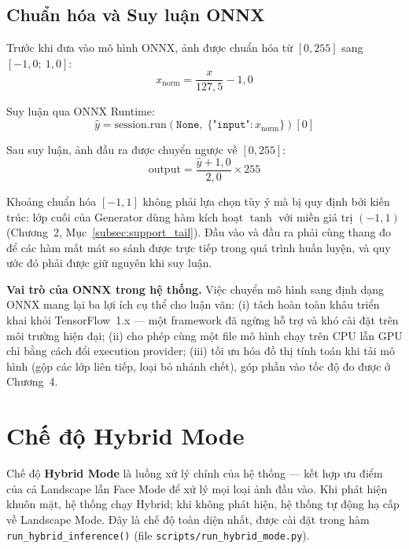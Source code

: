 \subsection{Chuẩn hóa và Suy luận ONNX}
\label{subsec:normalize_inference}

Trước khi đưa vào mô hình ONNX, ảnh được chuẩn hóa từ $[0, 255]$ sang $[-1{,}0;\ 1{,}0]$:
\begin{equation}
\label{eq:normalize}
x_{\text{norm}} = \frac{x}{127{,}5} - 1{,}0
\end{equation}

Suy luận qua ONNX Runtime:
\begin{equation}
\label{eq:onnx_inference}
\hat{y} = \text{session.run}\!\left(\texttt{None},\; \{\texttt{"input"}: x_{\text{norm}}\}\right)[0]
\end{equation}

Sau suy luận, ảnh đầu ra được chuyển ngược về $[0, 255]$:
\begin{equation}
\label{eq:denormalize}
\text{output} = \frac{\hat{y} + 1{,}0}{2{,}0} \times 255
\end{equation}

Khoảng chuẩn hóa $[-1, 1]$ không phải lựa chọn tùy ý mà bị quy định bởi kiến trúc: lớp cuối của Generator dùng hàm kích hoạt $\tanh$ với miền giá trị $(-1, 1)$ (Chương~2, Mục~\ref{subsec:support_tail}). Đầu vào và đầu ra phải cùng thang đo để các hàm mất mát so sánh được trực tiếp trong quá trình huấn luyện, và quy ước đó phải được giữ nguyên khi suy luận.

\textbf{Vai trò của ONNX trong hệ thống.} Việc chuyển mô hình sang định dạng ONNX \cite{ONNX2019} mang lại ba lợi ích cụ thể cho luận văn: (i) tách hoàn toàn khâu triển khai khỏi TensorFlow~1.x --- một framework đã ngừng hỗ trợ và khó cài đặt trên môi trường hiện đại; (ii) cho phép cùng một file mô hình chạy trên CPU lẫn GPU chỉ bằng cách đổi execution provider; (iii) tối ưu hóa đồ thị tính toán khi tải mô hình (gộp các lớp liên tiếp, loại bỏ nhánh chết), góp phần vào tốc độ đo được ở Chương~4.

\section{Chế độ Hybrid Mode}
\label{sec:hybrid_mode}

Chế độ \textbf{Hybrid Mode} là luồng xử lý chính của hệ thống --- kết hợp ưu điểm của cả Landscape lẫn Face Mode để xử lý mọi loại ảnh đầu vào. Khi phát hiện khuôn mặt, hệ thống chạy Hybrid; khi không phát hiện, hệ thống tự động hạ cấp về Landscape Mode. Đây là chế độ toàn diện nhất, được cài đặt trong hàm \texttt{run\_hybrid\_inference()} (file \texttt{scripts/run\_hybrid\_mode.py}).

